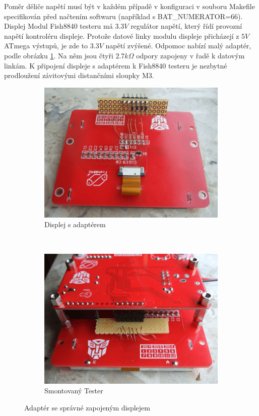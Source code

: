 Poměr děliče napětí musí být v každém případě v konfiguraci v souboru Makefile specifikován 
před načtením softwaru (například s BAT\_NUMERATOR=66).
Displej Modul Fish8840 testeru má \(3.3V\) regulátor napětí, který řídí provozní napětí kontroléru
displeje.
Protože datové linky modulu displeje přicházejí z \(5V\) ATmega výstupů, je zde to \(3.3V\) napětí
zvýšené.
Odpomoc nabízí malý adaptér, podle obrázku \ref{fig:Fish8840Adapt}. Na něm jsou čtyři \(2.7k\Omega\)
odpory zapojeny v řadě k datovým linkám.
K připojení displeje s adaptérem k Fish8840 testeru je nezbytné prodloužení závitovými distančními sloupky M3.

\begin{figure}[H]
  \begin{subfigure}[b]{.5\textwidth}
    \centering
    \includegraphics[width=1.\textwidth]{../PNG/Fish8840Adapt1.jpg}
    \caption{Displej s adaptérem}
  \end{subfigure}
  ~
  \begin{subfigure}[b]{.5\textwidth}
    \centering
    \includegraphics[width=1.\textwidth]{../PNG/Fish8840Adapt2.jpg}
    \caption{Smontovaný Tester}
  \end{subfigure}
  \caption{Adaptér se správné zapojeným displejem}
  \label{fig:Fish8840Adapt}
\end{figure}

